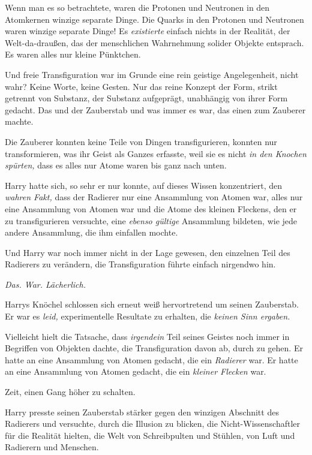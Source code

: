 {Wenn man es so betrachtete, waren die Protonen und Neutronen in den Atomkernen winzige separate Dinge. Die Quarks in den Protonen und Neutronen waren winzige separate Dinge! Es \emph{existierte} einfach nichts in der Realität, der Welt-da-draußen, das der menschlichen Wahrnehmung solider Objekte entsprach. Es waren alles nur kleine Pünktchen.

Und freie Transfiguration war im Grunde eine rein geistige Angelegenheit, nicht wahr? Keine Worte, keine Gesten. Nur das reine Konzept der Form, strikt getrennt von Substanz, der Substanz aufgeprägt, unabhängig von ihrer Form gedacht. Das und der Zauberstab und was immer es war, das einen zum Zauberer machte.

Die Zauberer konnten keine Teile von Dingen transfigurieren, konnten nur transformieren, was ihr Geist als Ganzes erfasste, weil sie es nicht \emph{in den Knochen spürten,} dass es alles nur Atome waren bis ganz nach unten.

Harry hatte sich, so sehr er nur konnte, auf dieses Wissen konzentriert, den \emph{wahren Fakt,} dass der Radierer nur eine Ansammlung von Atomen war, alles nur eine Ansammlung von Atomen war und die Atome des kleinen Fleckens, den er zu transfigurieren versuchte, eine \emph{ebenso gültige} Ansammlung bildeten, wie jede andere Ansammlung, die ihm einfallen mochte.

Und Harry war noch immer nicht in der Lage gewesen, den einzelnen Teil des Radierers zu verändern, die Transfiguration führte einfach nirgendwo hin.

\emph{Das. War. Lächerlich.}

Harrys Knöchel schlossen sich erneut weiß hervortretend um seinen Zauberstab. Er war es \emph{leid,} experimentelle Resultate zu erhalten, die \emph{keinen Sinn ergaben.}

Vielleicht hielt die Tatsache, dass \emph{irgendein} Teil seines Geistes noch immer in Begriffen von Objekten dachte, die Transfiguration davon ab, durch zu gehen. Er hatte an eine Ansammlung von Atomen gedacht, die ein \emph{Radierer} war. Er hatte an eine Ansammlung von Atomen gedacht, die ein \emph{kleiner Flecken} war.

Zeit, einen Gang höher zu schalten.

Harry presste seinen Zauberstab stärker gegen den winzigen Abschnitt des Radierers und versuchte, durch die Illusion zu blicken, die Nicht-Wissenschaftler für die Realität hielten, die Welt von Schreibpulten und Stühlen, von Luft und Radierern und Menschen.

}

